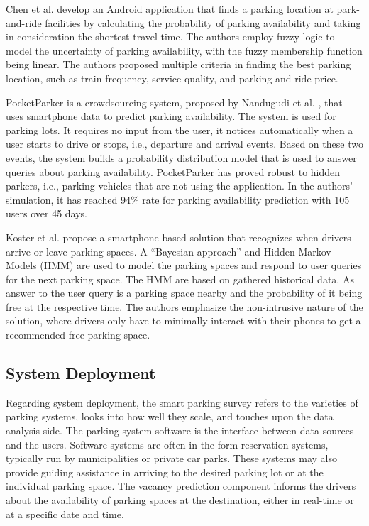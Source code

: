 	Chen et al.  develop an Android application that finds a parking location at park-and-ride facilities by calculating the probability of parking availability and taking in consideration the shortest travel time. The authors employ fuzzy logic to model the uncertainty of parking availability, with the fuzzy membership function being linear. The authors proposed multiple criteria in finding the best parking location, such as train frequency, service quality, and parking-and-ride price. 
	
	PocketParker is a crowdsourcing system, proposed by Nandugudi et al. , that uses smartphone data to predict parking availability. The system is used for parking lots. It requires no input from the user, it notices automatically when a user starts to drive or stops, i.e., departure and arrival events. Based on these two events, the system builds a probability distribution model that is used to answer queries about parking availability. PocketParker has proved robust to hidden parkers, i.e., parking vehicles that are not using the application. In the authors' simulation, it has reached 94\% rate for parking availability prediction with 105 users over 45 days. 
	
	Koster et al.  propose a smartphone-based solution that recognizes when drivers arrive or leave parking spaces. A ``Bayesian approach'' and Hidden Markov Models (HMM) are used to model the parking spaces and respond to user queries for the next parking space. The HMM are based on gathered historical data. As answer to the user query is a parking space nearby and the probability of it being free at the respective time. The authors emphasize the non-intrusive nature of the solution, where drivers only have to minimally interact with their phones to get a recommended free parking space.
	
	\subsection{System Deployment}
	Regarding system deployment, the smart parking survey refers to the varieties of parking systems, looks into how well they scale, and touches upon the data analysis side. The parking system software is the interface between data sources and the users. Software systems are often in the form reservation systems, typically run by municipalities or private car parks. These systems may also provide guiding assistance in arriving to the desired parking lot or at the individual parking space. The vacancy prediction component informs the drivers about the availability of parking spaces at the destination, either in real-time or at a specific date and time.
	

